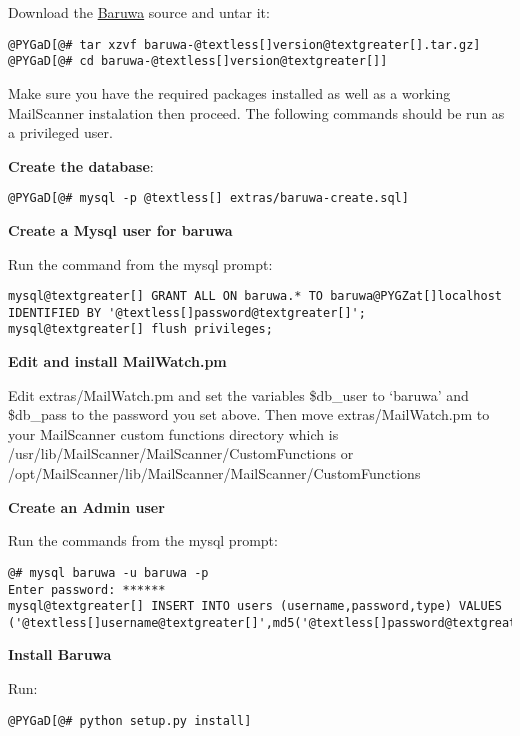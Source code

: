 \documentclass[a4paper,10pt,english]{manual}
\begin{document}
Download the \href{http://www.topdog.za.net/baruwa\#downloads}{Baruwa} source
and untar it:

\begin{Verbatim}[commandchars=@\[\]]
@PYGaD[@# tar xzvf baruwa-@textless[]version@textgreater[].tar.gz]
@PYGaD[@# cd baruwa-@textless[]version@textgreater[]]
\end{Verbatim}

Make sure you have the required packages installed as well as a working
MailScanner instalation then proceed. The following commands should be
run as a privileged user.

\textbf{Create the database}:

\begin{Verbatim}[commandchars=@\[\]]
@PYGaD[@# mysql -p @textless[] extras/baruwa-create.sql]
\end{Verbatim}

\textbf{Create a Mysql user for baruwa}

Run the command from the mysql prompt:

\begin{Verbatim}[commandchars=@\[\]]
mysql@textgreater[] GRANT ALL ON baruwa.* TO baruwa@PYGZat[]localhost IDENTIFIED BY '@textless[]password@textgreater[]';
mysql@textgreater[] flush privileges;
\end{Verbatim}

\textbf{Edit and install MailWatch.pm}

Edit extras/MailWatch.pm and set the variables \$db\_user to `baruwa' and
\$db\_pass to the password you set above. Then move extras/MailWatch.pm
to your MailScanner custom functions directory which is
/usr/lib/MailScanner/MailScanner/CustomFunctions or
/opt/MailScanner/lib/MailScanner/MailScanner/CustomFunctions

\textbf{Create an Admin user}

Run the commands from the mysql prompt:

\begin{Verbatim}[commandchars=@\[\]]
@# mysql baruwa -u baruwa -p
Enter password: ******
mysql@textgreater[] INSERT INTO users (username,password,type) VALUES ('@textless[]username@textgreater[]',md5('@textless[]password@textgreater[]'),'@textless[]name@textgreater[]','A');
\end{Verbatim}

\textbf{Install Baruwa}

Run:

\begin{Verbatim}[commandchars=@\[\]]
@PYGaD[@# python setup.py install]
\end{Verbatim}
\end{document}
